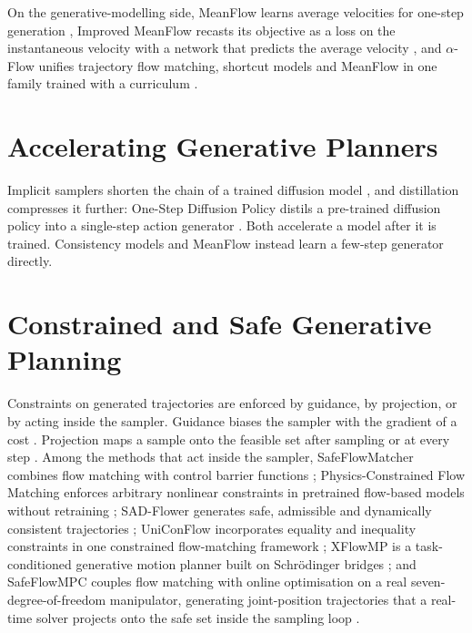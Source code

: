 On the generative-modelling side, MeanFlow learns average velocities for one-step generation
\parencite{geng2025meanflow}, Improved MeanFlow recasts its objective as a loss on the instantaneous
velocity with a network that predicts the average velocity \parencite{geng2025imf}, and $\alpha$-Flow
unifies trajectory flow matching, shortcut models and MeanFlow in one family trained with a curriculum
\parencite{zhang2025alphaflow}.

\section{Accelerating Generative Planners}\label{sec:rel:accel}

Implicit samplers shorten the chain of a trained diffusion model \parencite{song2021denoising}, and
distillation compresses it further: One-Step Diffusion Policy distils a pre-trained diffusion policy
into a single-step action generator \parencite{wang2024onedp}. Both accelerate a model after it is
trained. Consistency models \parencite{song2023consistency} and MeanFlow \parencite{geng2025meanflow}
instead learn a few-step generator directly.

\section{Constrained and Safe Generative Planning}\label{sec:rel:safety}

Constraints on generated trajectories are enforced by guidance, by projection, or by acting inside the
sampler. Guidance biases the sampler with the gradient of a cost \parencite{carvalho2025motion}.
Projection maps a sample onto the feasible set after sampling \parencite{power2023sampling} or at every
step \parencite{christopher2024constrained,romer2025diffusion}. Among the methods that act inside the
sampler, SafeFlowMatcher combines flow matching with control barrier functions
\parencite{yang2025safeflowmatcher}; Physics-Constrained Flow Matching enforces arbitrary nonlinear
constraints in pretrained flow-based models without retraining \parencite{utkarsh2025pcfm}; SAD-Flower
generates safe, admissible and dynamically consistent trajectories \parencite{huang2025sadflower};
UniConFlow incorporates equality and inequality constraints in one constrained flow-matching framework
\parencite{yang2025uniconflow}; XFlowMP is a task-conditioned generative motion planner built on
Schr\"odinger bridges \parencite{nguyen2025xflowmp}; and SafeFlowMPC couples flow matching with online
optimisation on a real seven-degree-of-freedom manipulator, generating joint-position trajectories
that a real-time solver projects onto the safe set inside the sampling loop
\parencite[Sec.~III]{oelerich2026safeflowmpc}.

